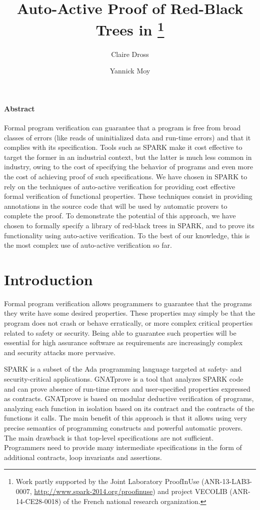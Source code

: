\documentclass{llncs}
\title{Auto-Active Proof of Red-Black Trees in \spark\thanks{Work partly
supported by the Joint Laboratory ProofInUse (ANR-13-LAB3-0007, 
\url{http://www.spark-2014.org/proofinuse}) and project VECOLIB 
(ANR-14-CE28-0018) of the French national research organization.}}
\author{Claire Dross \and Yannick Moy}
\institute{AdaCore, F-75009 Paris}
\date{}
\newcommand{\spark}{SPARK\xspace}
\begin{document}
\sloppy
{}
\maketitle

\paragraph{Abstract}
Formal program verification can guarantee that a program is free from broad
classes of errors (like reads of uninitialized data and run-time errors) and
that it complies with its specification. Tools such as \spark make it cost
effective to target the former in an industrial context, but the latter is much
less common in industry, owing to the cost of specifying the behavior of
programs and even more the cost of achieving proof of such specifications. We
have chosen in \spark to rely on the techniques of auto-active verification for
providing cost effective formal verification of functional properties. These
techniques consist in providing annotations in the source code that will be
used by automatic provers to complete the proof. To demonstrate
the potential of this approach, we have chosen to formally specify a library
of red-black trees in \spark, and to prove its functionality using auto-active
verification. To the best of our knowledge, this is the most complex use of
auto-active verification so far.


\section{Introduction}

Formal program verification allows programmers to guarantee that the programs
they write have some desired properties. These properties may simply be that
the program does not crash or behave erratically, or more complex critical
properties related to safety or security. Being able to guarantee such
properties will be essential for high assurance software as requirements are
increasingly complex and security attacks more pervasive.

SPARK is a subset of the Ada programming language targeted at safety- and
security-critical applications. GNATprove is a tool that analyzes SPARK code
and can prove absence of run-time errors and user-specified properties
expressed as contracts. GNATprove is based on modular deductive verification of
programs, analyzing each function in isolation based on its contract and the
contracts of the functions it calls. The main benefit of this approach is that
it allows using very precise semantics of programming constructs and powerful
automatic provers. The main drawback is that top-level specifications are not
sufficient. Programmers need to provide many intermediate specifications in the
form of additional contracts, loop invariants and assertions.
\end{document}
